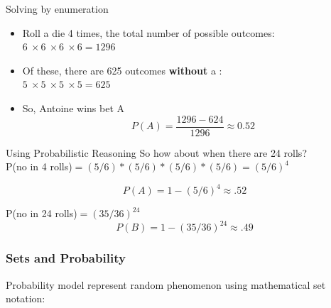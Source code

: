\documentclass[handout]{beamer}
\def\die#1{{\domino#1}}
\numberwithin{equation}{section}
\begin{document}
\begin{frame}{Solving by enumeration}
\begin{itemize}
\item[] Roll a die 4 times, the total number of possible outcomes:\\ $6\ \times 6\ \times 6\ \times 6 = 1296$\pause
\item[] Of these, there are 625 outcomes \textbf{without} a \die1:\\  $5\ \times 5\ \times 5\ \times 5 = 625$\pause
\item[] So, Antoine wins bet A 
$$P(A)= \frac{1296-624}{1296} \approx 0.52$$
\end{itemize}
\end{frame}


\begin{frame}{Using Probabilistic Reasoning}
So how about when there are 24 rolls?\\
\vspace{1 cm}
\pause
\vspace{1 cm}
P(no \die1 in 4 rolls)$ = (5/6)*(5/6)*(5/6)*(5/6)=(5/6)^4$

$$P(A) = 1- (5/6)^4\approx .52$$
\pause

\vspace{1 cm}

P(no \die1\die1 in 24 rolls)$ = (35/36)^{24}$
$$P(B)=1-(35/36)^{24} \approx .49$$
\end{frame}


\begin{frame}
\frametitle{Sets and Probability}

Probability model represent random phenomenon using mathematical set notation:\pause 
\begin{itemize}
 \pause 
{} \pause 
{} 
\end{itemize}
\end{frame}
\end{document}
